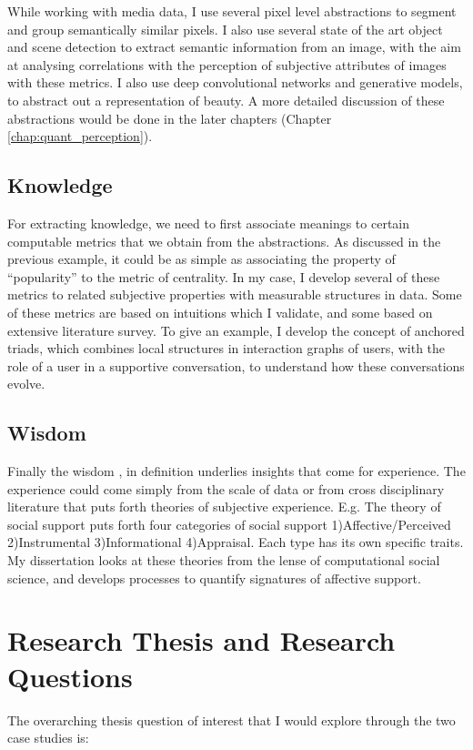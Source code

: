 While working with media data, I use several pixel level abstractions to segment and group semantically similar pixels. I also use several state of the art object and scene detection to extract semantic information from an image, with the aim at analysing correlations with the perception of subjective attributes of images with these metrics. I also use deep convolutional networks and generative models, to abstract out a representation of beauty. A more detailed discussion of these abstractions would be done in the later chapters (Chapter \ref{chap:quant_perception}).  

\subsection{Knowledge}
For extracting knowledge, we need to first associate meanings to certain computable metrics that we obtain from the abstractions. As discussed in the previous example, it could be as simple as associating the property of ``popularity'' to the metric of centrality. In my case, I develop several of these metrics to related subjective properties with measurable structures in data. Some of these metrics are based on intuitions which I validate, and some based on extensive literature survey. To give an example, I develop the concept of anchored triads, which combines local structures in interaction graphs of users, with the role of a user in a supportive conversation, to understand how these conversations evolve.

\subsection{Wisdom}
Finally the wisdom , in definition underlies insights that come for experience. The experience could come simply from the scale of data or from cross disciplinary literature that puts forth theories of subjective experience. E.g. The theory of social support puts forth four categories of social support 1)Affective/Perceived 2)Instrumental 3)Informational 4)Appraisal. Each type has its own specific traits. My dissertation looks at these theories from the lense of computational social science, and develops processes to quantify signatures of affective support.

\section{Research Thesis and Research Questions}
The overarching thesis question of interest that I would explore through the two case studies is:

